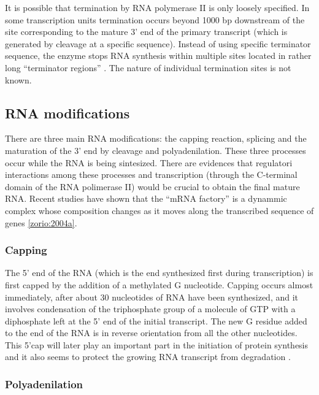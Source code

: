 It is possible that termination by RNA polymerase II is only loosely
specified. In some transcription units termination occurs beyond 1000
bp downstream of the site corresponding to the mature 3' end of the
primary transcript (which is generated by cleavage at a specific
sequence). Instead of using specific terminator sequence, the enzyme
stops RNA synthesis within multiple sites located in rather long
``terminator regions'' \citep{lewis:1997a}. The nature of individual
termination sites is not known.


\subsection*{RNA modifications}

There are three main RNA modifications: the capping reaction, splicing
and the maturation of the 3' end by cleavage and polyadenilation.
These three processes occur while the RNA is being sintesized. There
are evidences that regulatori interactions among these processes and
transcription (through the C-terminal domain of the RNA polimerase II)
would be crucial to obtain the final mature RNA. Recent studies have
shown that the ``mRNA factory'' is a dynammic complex whose
composition changes as it moves along the transcribed sequence of genes
\ref{zorio:2004a}. 

\subsubsection{Capping}

The 5' end of the RNA (which is the end synthesized first during
transcription) is first capped by the addition of a methylated G
nucleotide. Capping occurs almost immediately, after about 30
nucleotides of RNA have been synthesized, and it involves condensation
of the triphosphate group of a molecule of GTP with a diphosphate left
at the 5' end of the initial transcript. The new G residue added to
the end of the RNA is in reverse orientation from all the other
nucleotides. This 5'cap will later play an important part in the
initiation of protein synthesis and it also seems to protect the
growing RNA transcript from degradation \citep{lewis:1997a}.

\subsubsection{Polyadenilation}

